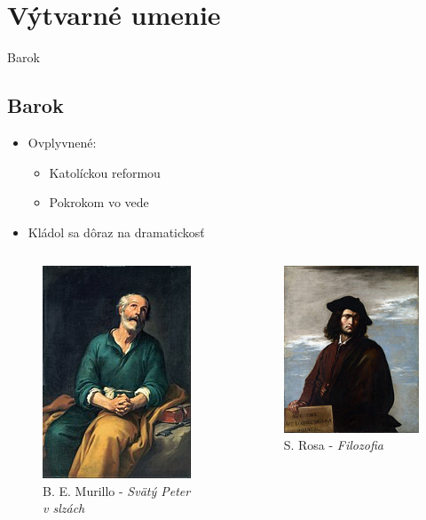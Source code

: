 \documentclass[dvipsnames]{beamer}
\begin{document}
\section{Výtvarné umenie}
\frame{\sectionpage}
\begin{frame}{Barok}
	\subsection{Barok}
	\begin{itemize}
		\item Ovplyvnené:
		\begin{itemize}
			\item Katolíckou reformou
			\item Pokrokom vo vede
		\end{itemize}
		\item Kládol sa dôraz na dramatickosť
	\end{itemize}
	\begin{columns}
		\kern0pt
		\begin{figure}
			\includegraphics[scale=0.5]{slzi}
			\caption{\textcolor{BurntOrange}{B. E. Murillo}  - \textit{Svätý Peter v slzách}}

		\end{figure}%

		\begin{figure}
			\includegraphics[scale=0.5]{filo}
			\caption{\textcolor{BurntOrange}{S. Rosa} - \textit{Filozofia}}
		\end{figure}
	\end{columns}
\end{frame}
\end{document}
